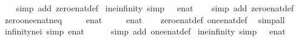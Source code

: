 \begin{isabellebody}
%
\isadelimproof
\ \ %
\endisadelimproof
%
\isatagproof
{}\isamarkupfalse%
\ {\isacharparenleft}simp\ add{\isacharcolon}\ zero{\isacharunderscore}enat{\isacharunderscore}def{\isacharparenright}%
\endisatagproof
{\isafoldproof}%
%
\isadelimproof
\isanewline
%
\endisadelimproof
\isanewline
{}\isamarkupfalse%
\ i{}{\isacharunderscore}ne{\isacharunderscore}infinity\ {\isacharbrackleft}simp{\isacharbrackright}{\isacharcolon}\ {\isachardoublequoteopen}{}\ {\isasymnoteq}\ {\isacharparenleft}{\isasyminfinity}{\isacharcolon}{\isacharcolon}enat{\isacharparenright}{\isachardoublequoteclose}\isanewline
%
\isadelimproof
\ \ %
\endisadelimproof
%
\isatagproof
{}\isamarkupfalse%
\ {\isacharparenleft}simp\ add{\isacharcolon}\ zero{\isacharunderscore}enat{\isacharunderscore}def{\isacharparenright}%
\endisatagproof
{\isafoldproof}%
%
\isadelimproof
\isanewline
%
\endisadelimproof
\isanewline
{}\isamarkupfalse%
\ zero{\isacharunderscore}one{\isacharunderscore}enat{\isacharunderscore}neq{\isacharcolon}\isanewline
\ \ {\isachardoublequoteopen}{\isasymnot}\ {}\ {\isacharequal}\ {\isacharparenleft}{}{\isacharcolon}{\isacharcolon}enat{\isacharparenright}{\isachardoublequoteclose}\isanewline
\ \ {\isachardoublequoteopen}{\isasymnot}\ {}\ {\isacharequal}\ {\isacharparenleft}{}{\isacharcolon}{\isacharcolon}enat{\isacharparenright}{\isachardoublequoteclose}\isanewline
%
\isadelimproof
\ \ %
\endisadelimproof
%
\isatagproof
{}\isamarkupfalse%
\ zero{\isacharunderscore}enat{\isacharunderscore}def\ one{\isacharunderscore}enat{\isacharunderscore}def\ \isamarkupfalse%
\ simp{\isacharunderscore}all%
\endisatagproof
{\isafoldproof}%
%
\isadelimproof
\isanewline
%
\endisadelimproof
\isanewline
{}\isamarkupfalse%
\ infinity{\isacharunderscore}ne{\isacharunderscore}i{}\ {\isacharbrackleft}simp{\isacharbrackright}{\isacharcolon}\ {\isachardoublequoteopen}{\isacharparenleft}{\isasyminfinity}{\isacharcolon}{\isacharcolon}enat{\isacharparenright}\ {\isasymnoteq}\ {}{\isachardoublequoteclose}\isanewline
%
\isadelimproof
\ \ %
\endisadelimproof
%
\isatagproof
{}\isamarkupfalse%
\ {\isacharparenleft}simp\ add{\isacharcolon}\ one{\isacharunderscore}enat{\isacharunderscore}def{\isacharparenright}%
\endisatagproof
{\isafoldproof}%
%
\isadelimproof
\isanewline
%
\endisadelimproof
\isanewline
{}\isamarkupfalse%
\ i{}{\isacharunderscore}ne{\isacharunderscore}infinity\ {\isacharbrackleft}simp{\isacharbrackright}{\isacharcolon}\ {\isachardoublequoteopen}{}\ {\isasymnoteq}\ {\isacharparenleft}{\isasyminfinity}{\isacharcolon}{\isacharcolon}enat{\isacharparenright}{\isachardoublequoteclose}\isanewline

\end{isabellebody}

